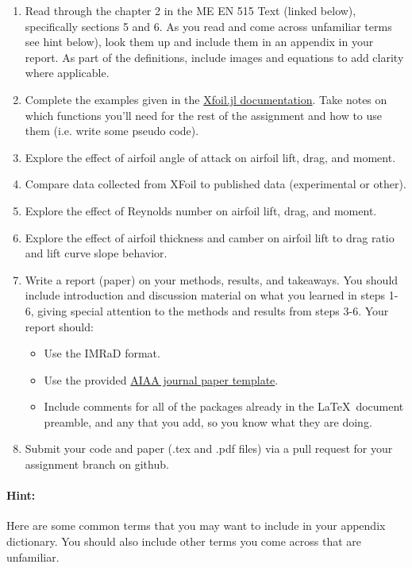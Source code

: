 \documentclass[12pt]{article}
\begin{document}
\begin{enumerate}
	\item Read  through the chapter 2 in the ME EN 515 Text (linked below), specifically sections 5 and 6.  As you read and come across unfamiliar terms see hint below), look them up and include them in an appendix in your report.  As part of the definitions, include images and equations to add clarity where applicable.
	\item Complete the examples given in the \href{https://flow.byu.edu/Xfoil.jl/stable/}{Xfoil.jl documentation}. Take notes on which functions you'll need for the rest of the assignment and how to use them (i.e. write some pseudo code). 
	\item Explore the effect of airfoil angle of attack on airfoil lift, drag, and moment.
	\item Compare data collected from XFoil to published data (experimental or other). 
	\item Explore the effect of Reynolds number on airfoil lift, drag, and moment.
	\item Explore the effect of airfoil thickness and camber on airfoil lift to drag ratio and lift curve slope behavior.
	\item Write a report (paper) on your methods, results, and takeaways. You should include introduction and discussion material on what you learned in steps 1-6, giving special attention to the methods and results from steps 3-6. Your report should:
	\begin{itemize}
		\item Use the IMRaD format.
		\item Use the provided \href{https://github.com/byuflowlab/undergrad-onboarding/tree/497R/497R/latex_templates/paper1_aiaa}{AIAA journal paper template}.
		\item Include comments for all of the packages already in the \LaTeX~document preamble, and any that you add, so you know what they are doing. 
	\end{itemize}
	\item Submit your code and paper (.tex and .pdf files) via a pull request for your assignment branch on github.
\end{enumerate}

\bigskip

\paragraph{Hint:} Here are some common terms that you may want to include in your appendix dictionary. You should also include other terms you come across that are unfamiliar.
\end{document}
